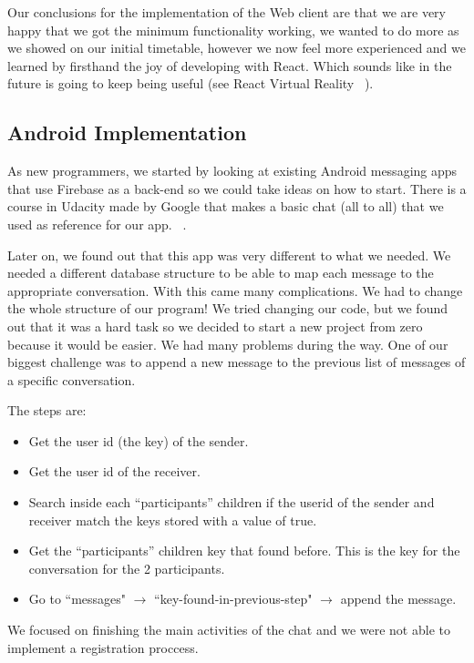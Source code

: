 Our conclusions for the implementation of the Web client are that we are very happy that we got the minimum functionality working, we wanted to do more as we showed on our initial timetable, however we now feel more experienced and we learned by firsthand the joy of developing with React. Which sounds like in the future is going to keep being useful (see React Virtual Reality ~\cite{4545etet}).


\subsection{Android Implementation}

As new programmers, we started by looking at existing Android messaging apps that use Firebase as a back-end so we could take ideas on how to start. There is a course in Udacity made by Google that makes a basic chat (all to all) that we used as reference for our app. ~\cite{4664rtyrtr67}.

Later on, we found out that this app was very different to what we needed. We needed a different database structure to be able to map each message to the appropriate conversation. With this came many complications. We had to change the whole structure of our program! We tried changing our code, but we found out that it was a hard task so we decided to start a new project from zero because it would be easier.
We had many problems during the way. One of our biggest challenge was to append a new message to the previous list of messages of a specific conversation.

The steps are:

\begin{itemize}
	\item Get the user id (the key) of the sender.
	\item Get the user id of the receiver.
	\item Search inside each “participants” children if the userid of the sender and receiver match the keys stored with a value of true.
	\item Get the “participants” children key that found before. This is the key for the conversation for the 2 participants.
	\item Go to ``messages" $\rightarrow$ ``key-found-in-previous-step" $\rightarrow$ append the message.
\end{itemize}

We focused on finishing the main activities of the chat and we were not able to implement a registration proccess.

